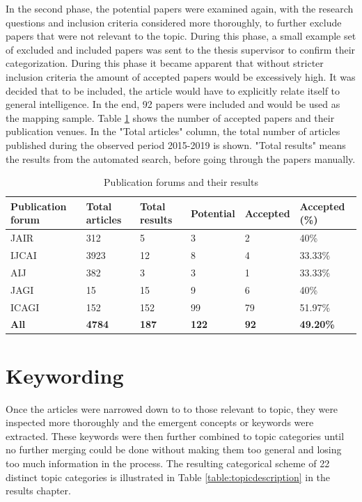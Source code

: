 \documentclass[utf8,english]{gradu3}
\begin{document}
In the second phase, the potential papers were examined again, with the research
questions and inclusion criteria considered more thoroughly, to further exclude
papers that were not relevant to the topic. During this phase, a small example
set of excluded and included papers was sent to the thesis supervisor to confirm
their categorization. During this phase it became apparent that without stricter
inclusion criteria the amount of accepted papers would be excessively high. It
was decided that to be included, the article would have to explicitly relate
itself to general intelligence. In the end, 92 papers were included and would be
used as the mapping sample. Table \ref*{table:forumtable} shows the number of
accepted papers and their publication venues. In the "Total articles" column,
the total number of articles published during the observed period 2015-2019 is
shown. "Total results" means the results from the automated search, before going
through the papers manually.

  \begin{table}[H]
    \footnotesize
    \centering
    \begin{tabular}{|l|l|l|l|l|l|}
      \hline
      \textbf{Publication forum}  & \textbf{Total articles} & \textbf{Total results} & \textbf{Potential} & \textbf{Accepted} & \textbf{Accepted (\%)} \\ \hline
      JAIR   & 312 & 5   & 3  & 2  & 40\%  \\ \hline
      IJCAI  & 3923 & 12  & 8  & 4  & 33.33\%  \\ \hline
      AIJ    & 382 & 3   & 3  & 1   & 33.33\%  \\ \hline
      JAGI   & 15 & 15  & 9  & 6   & 40\%  \\ \hline
      ICAGI  & 152 & 152 & 99 & 79  & 51.97\%  \\ \hline
      \textbf{All} & \textbf{4784} & \textbf{187} & \textbf{122}  & \textbf{92}  & \textbf{49.20\%}  \\ \hline
    \end{tabular}
    \caption{Publication forums and their results}
    \label{table:forumtable}
  \end{table}

\section{Keywording}
Once the articles were narrowed down to to those relevant to topic, they were
inspected more thoroughly and the emergent concepts or keywords were extracted.
These keywords were then further combined to topic categories until no further
merging could be done without making them too general and losing too much
information in the process. The resulting categorical scheme of 22 distinct
topic categories is illustrated in Table \ref{table:topicdescription} in the
results chapter.  
\end{document}
